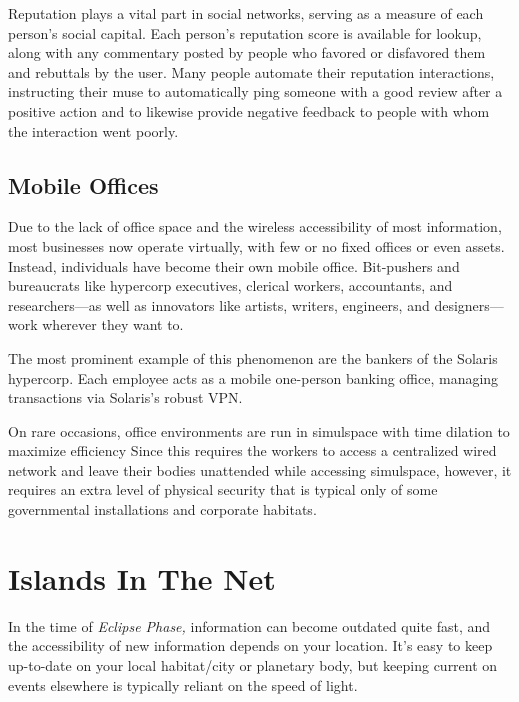 Reputation plays a vital part in social networks, 
serving as a measure of each person's social capital. 
Each person's reputation score is available for lookup, 
along with any commentary posted by people who 
favored or disfavored them and rebuttals by the user. 
Many people automate their reputation interactions, 
instructing their muse to automatically ping someone
with a good review after a positive action and
to likewise provide negative feedback to people with 
whom the interaction went poorly.

\subsection{Mobile Offices}

Due to the lack of office space and the wireless accessibility
of most information, most businesses
now operate virtually, with few or no fixed offices 
or even assets. Instead, individuals have become their 
own mobile office. Bit-pushers and bureaucrats like 
hypercorp executives, clerical workers, accountants, 
and researchers—as well as innovators like artists, 
writers, engineers, and designers—work wherever 
they want to.

The most prominent example of this phenomenon 
are the bankers of the Solaris hypercorp. Each employee
acts as a mobile one-person banking office,
managing transactions via Solaris's robust VPN.

 On rare occasions, office environments are run 
in simulspace with time dilation to maximize efficiency
Since this requires the workers to access a
centralized wired network and leave their bodies 
unattended while accessing simulspace, however, it 
requires an extra level of physical security that is 
typical only of some governmental installations and 
corporate habitats.

\section{Islands In The Net}

In the time of \textit{Eclipse Phase,} information can become 
outdated quite fast, and the accessibility of new information
depends on your location. It's easy to keep up-to-date
on your local habitat/city or planetary body,
but keeping current on events elsewhere is typically 
reliant on the speed of light.

